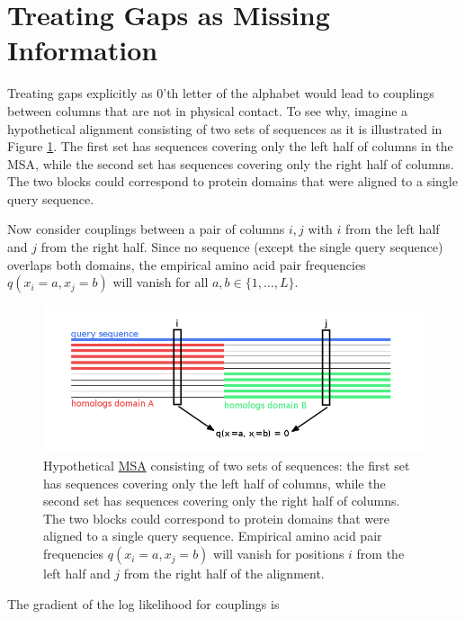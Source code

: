 \documentclass[12pt,a4paper,twoside]{book}
\newcommand{\eq}{\!=\!}
\theoremstyle{definition}
\theoremstyle{definition}
\theoremstyle{remark}
\begin{document}
\section{Treating Gaps as Missing Information}\label{gap-treatment}

Treating gaps explicitly as 0'th letter of the alphabet would lead to
couplings between columns that are not in physical contact. To see why,
imagine a hypothetical alignment consisting of two sets of sequences as
it is illustrated in Figure \ref{fig:gap-treatment}. The first set has
sequences covering only the left half of columns in the MSA, while the
second set has sequences covering only the right half of columns. The
two blocks could correspond to protein domains that were aligned to a
single query sequence.

Now consider couplings between a pair of columns \(i, j\) with \(i\)
from the left half and \(j\) from the right half. Since no sequence
(except the single query sequence) overlaps both domains, the empirical
amino acid pair frequencies \(q(x_i = a, x_j = b)\) will vanish for all
\(a, b \in \{1,... , L\}\).










\begin{figure}
\includegraphics[width=11.11in]{img/gap_treatment} \caption{Hypothetical \protect\hyperlink{abbrev}{MSA}
consisting of two sets of sequences: the first set has sequences
covering only the left half of columns, while the second set has
sequences covering only the right half of columns. The two blocks could
correspond to protein domains that were aligned to a single query
sequence. Empirical amino acid pair frequencies
\(q(x_i \eq a, x_j \eq b)\) will vanish for positions \(i\) from the
left half and \(j\) from the right half of the alignment.}\label{fig:gap-treatment}
\end{figure}

The gradient of the log likelihood for couplings is
\end{document}
